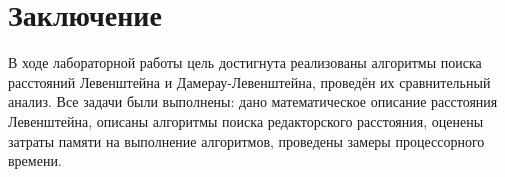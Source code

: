 \chapter*{Заключение}
\label{cha:conclusion}
В ходе лабораторной работы цель достигнута реализованы алгоритмы поиска расстояний Левенштейна и Дамерау-Левенштейна, проведён их сравнительный анализ. Все задачи были выполнены: дано математическое описание расстояния Левенштейна, описаны алгоритмы поиска редакторского расстояния, оценены затраты памяти на выполнение алгоритмов, проведены замеры процессорного времени.